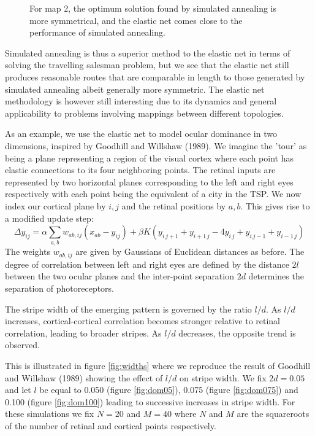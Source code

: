 \documentclass{article}
\begin{document}
\begin{figure}[h]
\begin{subfigure}[t]{0.28\linewidth}
		\label{fig:comp2an}	
	\end{subfigure}%
\caption{For map 2, the optimum solution found by simulated annealing is more symmetrical, and the elastic net comes close to the performance of simulated annealing.}
\label{fig:comp2}
\end{figure}


Simulated annealing is thus a superior method to the elastic net in terms of solving the travelling salesman problem, but we see that the elastic net still produces reasonable routes that are comparable in length to those generated by simulated annealing albeit generally more symmetric. The elastic net methodology is however still interesting due to its dynamics and general applicability to problems involving mappings between different topologies.

As an example, we use the elastic net to model ocular dominance in two dimensions, inspired by Goodhill and Willshaw (1989). We imagine the 'tour' as being a plane representing a region of the visual cortex where each point has elastic connections to its four neighboring points. The retinal inputs are represented by two horizontal planes corresponding to the left and right eyes respectively with each point being the equivalent of a city in the TSP. We now index our cortical plane by $i, j$ and the retinal positions by $a, b$. This gives rise to a modified update step:
\begin{equation}\label{eq:update2}
\Delta y_{ij} =\alpha \sum_{a,b}{w_{ab,ij}(x_{ab}-y_{ij})} + \beta K (y_{i \, j+1} + y_{i+1 \, j} - 4y_{i \, j} + y_{i \, j-1} + y_{i-1 \, j})
\end{equation}
The weights $w_{ab,ij}$ are given by Gaussians of Euclidean distances as before. The degree of correlation between left and right eyes are defined by the distance $2l$ between the two ocular planes and the inter-point separation $2d$ determines the separation of photoreceptors.

The stripe width of the emerging pattern is governed by the ratio $l/d$. As $l/d$ increases, cortical-cortical correlation becomes stronger relative to retinal correlation, leading to broader stripes. As $l/d$ decreases, the opposite trend is observed.

This is illustrated in figure \ref{fig:widths} where we reproduce the result of Goodhill and Willshaw (1989) showing the effect of $l/d$ on stripe width. We fix $2d=0.05$ and let $l$ be equal to 0.050 (figure \ref{fig:dom05}), 0.075 (figure \ref{fig:dom075}) and 0.100 (figure \ref{fig:dom100}) leading to successive increases in stripe width. For these simulations we fix $N=20$ and $M=40$ where $N$ and $M$ are the squareroots of the number of retinal and cortical points respectively.
\end{document}
